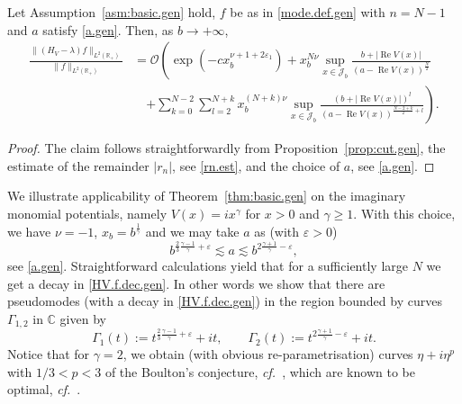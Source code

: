 \begin{Theorem}\label{thm:basic.gen}
Let Assumption~\ref{asm:basic.gen} hold, $f$ be as in \eqref{mode.def.gen} with $n=N-1$ and $a$ satisfy \eqref{a.gen}.
Then, as $b \to + \infty$, 
\begin{equation}\label{HV.f.dec.gen}
\begin{aligned}
\frac{\|(H_V-\lambda) f\|_{L^2({\mathbb{R}}_+)}}{\|f\|_{L^2({\mathbb{R}}_+)}} 
&= 
{\mathcal{O}} \left( \exp(-c x_b^{\nu+1 +2{\varepsilon}_1})
+
x_b^{N\nu}
\sup_{x \in {\mathcal J}_b} \frac{b + |{\operatorname{Re}} V(x)|}{\left(a-{\operatorname{Re}} V(x)\right)^\frac{N}{2}} 
\right.
\\
& \quad  \left. +
\sum_{k=0}^{N-2}
\sum_{l=2}^{N+k}
x_b^{(N+k)\nu}
\sup_{x \in {\mathcal J}_b} \frac{(b + |{\operatorname{Re}} V(x)|)^l}{\left(a-{\operatorname{Re}} V(x)\right)^{\frac{N-2+k}{2}+l}} 
\right).
\end{aligned}
\end{equation}
\end{Theorem}
\begin{proof}
The claim follows straightforwardly from Proposition~\ref{prop:cut.gen}, the estimate of the remainder $|r_n|$, see \eqref{rn.est}, and the choice of $a$, see \eqref{a.gen}. 
\end{proof}

\begin{Example} 	
\label{ex:pol.Omega}
	
We illustrate applicability of Theorem~\ref{thm:basic.gen} on the imaginary  monomial potentials, namely $V(x) = i x^\gamma$ for $x>0$ and $\gamma \geq 1$. With this choice, we have $\nu=-1$, $x_b = b^\frac 1\gamma$ and we may take $a$ as (with ${\varepsilon}>0$)
\begin{equation}\label{optimality}
b^{\frac 23 \frac{\gamma-1}{\gamma} + {\varepsilon} } 
{\lesssim} a {\lesssim} 
b^{2 \frac{\gamma+1}{\gamma} - {\varepsilon}},
\end{equation}
see \eqref{a.gen}. Straightforward calculations yield that for a sufficiently large $N$ we get a decay in \eqref{HV.f.dec.gen}. In other words we show that there are pseudomodes (with a decay in \eqref{HV.f.dec.gen}) in the region bounded by curves $\Gamma_{1,2}$ in ${\mathbb{C}}$ given by
\begin{equation}
\Gamma_1(t) := t^{\frac 23 \frac{\gamma-1}{\gamma} + {\varepsilon}} + i t, \qquad 
\Gamma_2(t) := t^{2 \frac{\gamma+1}{\gamma} - {\varepsilon}} + it. 
\end{equation}
Notice that for $\gamma =2$, we obtain (with obvious re-parametrisation) curves $\eta + i \eta^p$ with $1/3 < p<3$ of the Boulton's conjecture, {\emph{cf.}}~\cite{Boulton_2002},  which are known to be optimal, {\emph{cf.}}~\cite{Pravda-Starov_2006}. 
\end{Example}

